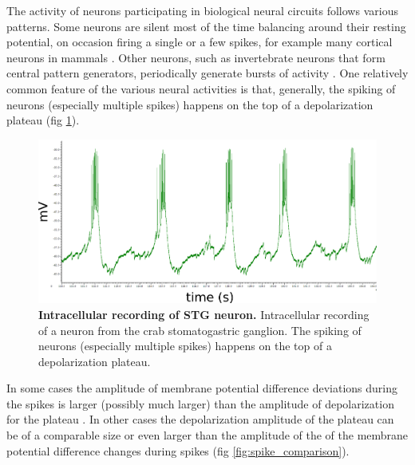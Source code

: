The activity of neurons participating in biological neural circuits follows various patterns. Some neurons are silent most of the time balancing around their resting potential, on occasion firing a single or a few spikes, for example many cortical neurons in mammals \cite{Brumberg2000}. Other neurons, such as invertebrate neurons that form central pattern generators, periodically generate bursts of activity \cite{Harris-Warrick1992}. One relatively common feature of the various neural activities is that, generally, the spiking of neurons (especially multiple spikes) happens on the top of a depolarization plateau (fig \ref{fig:spikes}). 

\begin{figure}[H]
	\begin{center}
		\includegraphics[width=\columnwidth]{graphics/PD_intra.png}
		\caption[Intracellular recording of \ac{STG} neuron.]{\textbf{Intracellular recording of \ac{STG} neuron.} Intracellular recording of a neuron from the crab stomatogastric ganglion. The spiking of neurons (especially multiple spikes) happens on the top of a depolarization plateau.}
		\label{fig:spikes}
	\end{center}
\end{figure}

In some cases the amplitude of membrane potential difference deviations during the spikes is larger (possibly much larger) than the amplitude of depolarization for the plateau \cite{Brumberg2000}. In other cases the depolarization amplitude of the plateau can be of a comparable size or even larger than the amplitude of the of the membrane potential difference changes during spikes \cite{Harris-Warrick1992} (fig \ref{fig:spike_comparison}). 

